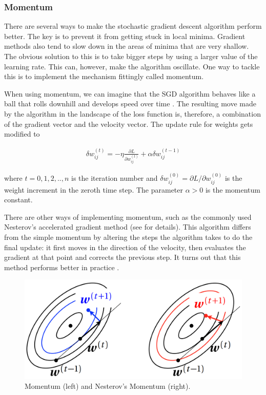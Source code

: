 \subsubsection{Momentum}

There are several ways to make the stochastic gradient descent algorithm perform better. The key is to prevent it from getting stuck in local minima. Gradient methods also tend to slow down in the areas of minima that are very shallow. The obvious solution to this is to take bigger steps by using a larger value of the learning rate. This can, however, make the algorithm oscillate. \cite{mehlig} One way to tackle this is to implement the mechanism fittingly called momentum. 

When using momentum, we can imagine that the SGD algorithm behaves like a ball that rolls downhill and develops speed over time \cite{stanford-L7}. The resulting move made by the algorithm in the landscape of the loss function is, therefore, a combination of the gradient vector and the velocity vector. The update rule for weights gets modified to \cite{mehlig}

\begin{gather}
\delta w_{ij}^{(t)} = - \eta \frac{\partial L}{\partial w_{ij}^{(t)}} + \alpha \delta w_{ij}^{(t-1)} 
\end{gather}

\noindent where $ t=0,1,2,..,n $ is the iteration number and $ \delta w_{ij}^{(0)} = \partial L / \partial w_{ij}^{(0)} $ is the weight increment in the zeroth time step. The parameter $ \alpha > 0$ is the momentum constant. 

There are other ways of implementing momentum, such as the commonly used Nesterov's accelerated gradient method (see \cite{mehlig} \cite{stanford-github} for details). This algorithm differs from the simple momentum by altering the steps the algorithm takes to do the final update: it first moves in the direction of the velocity, then evaluates the gradient at that point and corrects the previous step. It turns out that this method performs better in practice \cite{stanford-L7}.


\vspace{4mm}
\begin{figure}[htb]
	\begin{center}
		\includegraphics*[width=12cm, keepaspectratio]{obr/momentum.png}
	\end{center}
	\vspace{4mm}
	\caption{Momentum (left) and Nesterov's Momentum (right). \cite{mehlig}} 
	\label{momentum}
\end{figure}

